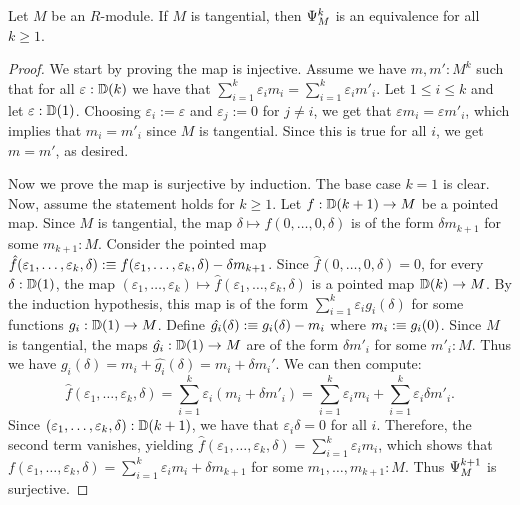 \begin{proposition}\label{prp:tangential-implies-gen-can-equiv}
  Let $M$ be an $R$-module. If $M$ is tangential, then $\Psi_M^k$ is an equivalence for all $k \geq 1$.
\end{proposition}

\begin{proof}
  We start by proving the map is injective.
  Assume we have $m, m' : M^k$ such that for all $\varepsilon:\mathbb{D}(k)$ we have that $\sum_{i=1}^k\varepsilon_im_i = \sum_{i=1}^k\varepsilon_im'_i$.
  Let $1 \leq i \leq k$ and let $\varepsilon : \mathbb{D}(1)$.
  Choosing $\varepsilon_i := \varepsilon$ and $\varepsilon_j := 0$ for $j \neq i$, we get that $\varepsilon m_i = \varepsilon m'_i$, which implies that $m_i = m'_i$ since $M$ is tangential.
  Since this is true for all $i$, we get $m = m'$, as desired.

  Now we prove the map is surjective by induction.
  The base case $k=1$ is clear.
  Now, assume the statement holds for $k \ge 1$.
  Let $f : \mathbb{D}(k+1) \to M$ be a pointed map.
  Since $M$ is tangential, the map $\delta \mapsto f(0, \dots, 0, \delta)$ is of the form $\delta m_{k+1}$ for some $m_{k+1} : M$.
  Consider the pointed map $\hat{f}(\varepsilon_1, \dots, \varepsilon_k, \delta) :\equiv f(\varepsilon_1, \dots, \varepsilon_k, \delta) - \delta m_{k+1}$.
  Since $\hat{f}(0, \dots, 0, \delta) = 0$,
  for every $\delta : \mathbb{D}(1)$, the map $(\varepsilon_1, \dots, \varepsilon_k) \mapsto \hat{f}(\varepsilon_1, \dots, \varepsilon_k, \delta)$ is a pointed map $\mathbb{D}(k) \to M$.
  By the induction hypothesis, this map is of the form $\sum_{i=1}^k \varepsilon_i g_i(\delta)$ for some functions $g_i : \mathbb{D}(1) \to M$.
  Define $\hat{g_i}(\delta) :\equiv g_i(\delta) - m_i$ where $m_i :\equiv g_i(0)$.
  Since $M$ is tangential, the maps $\hat{g_i} : \mathbb{D}(1) \to M$ are of the form $\delta m'_i$ for some $m'_i : M$.
  Thus we have $g_i(\delta) = m_i + \hat{g_i}(\delta) = m_i + \delta m_i'$.
  We can then compute:
  \[ \hat{f}(\varepsilon_1, \dots, \varepsilon_k, \delta) = \sum_{i=1}^k \varepsilon_i (m_i + \delta m'_i) = \sum_{i=1}^k \varepsilon_i m_i + \sum_{i=1}^k \varepsilon_i \delta m'_i. \]
  Since $(\varepsilon_1, \dots, \varepsilon_k, \delta) : \mathbb{D}(k+1)$, we have that $\varepsilon_i \delta = 0$ for all $i$.
  Therefore, the second term vanishes, yielding $\hat{f}(\varepsilon_1, \dots, \varepsilon_k, \delta) = \sum_{i=1}^k \varepsilon_i m_i$, which shows that $f(\varepsilon_1, \dots, \varepsilon_k, \delta) = \sum_{i=1}^k \varepsilon_i m_i + \delta m_{k+1}$ for some $m_1, \dots, m_{k+1} : M$.
  Thus $\Psi_M^{k+1}$ is surjective.
\end{proof}

